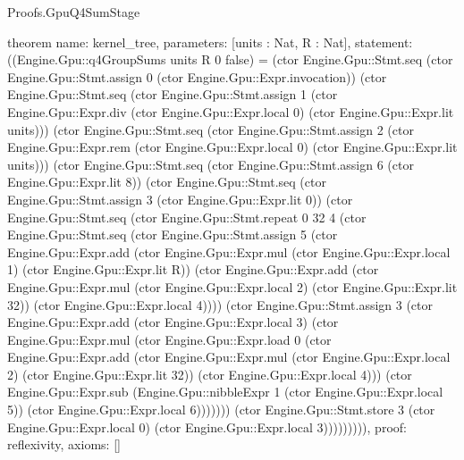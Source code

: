 \begin{lexlean}{Proofs.GpuQ4SumStage}
\begin{semanticmodule}
theorem{
  name: kernel_tree,
  parameters: [units : Nat, R : Nat],
  statement: ((Engine.Gpu::q4GroupSums units R 0 false) = (ctor Engine.Gpu::Stmt.seq (ctor Engine.Gpu::Stmt.assign 0 (ctor Engine.Gpu::Expr.invocation)) (ctor Engine.Gpu::Stmt.seq (ctor Engine.Gpu::Stmt.assign 1 (ctor Engine.Gpu::Expr.div (ctor Engine.Gpu::Expr.local 0) (ctor Engine.Gpu::Expr.lit units))) (ctor Engine.Gpu::Stmt.seq (ctor Engine.Gpu::Stmt.assign 2 (ctor Engine.Gpu::Expr.rem (ctor Engine.Gpu::Expr.local 0) (ctor Engine.Gpu::Expr.lit units))) (ctor Engine.Gpu::Stmt.seq (ctor Engine.Gpu::Stmt.assign 6 (ctor Engine.Gpu::Expr.lit 8)) (ctor Engine.Gpu::Stmt.seq (ctor Engine.Gpu::Stmt.assign 3 (ctor Engine.Gpu::Expr.lit 0)) (ctor Engine.Gpu::Stmt.seq (ctor Engine.Gpu::Stmt.repeat 0 32 4 (ctor Engine.Gpu::Stmt.seq (ctor Engine.Gpu::Stmt.assign 5 (ctor Engine.Gpu::Expr.add (ctor Engine.Gpu::Expr.mul (ctor Engine.Gpu::Expr.local 1) (ctor Engine.Gpu::Expr.lit R)) (ctor Engine.Gpu::Expr.add (ctor Engine.Gpu::Expr.mul (ctor Engine.Gpu::Expr.local 2) (ctor Engine.Gpu::Expr.lit 32)) (ctor Engine.Gpu::Expr.local 4)))) (ctor Engine.Gpu::Stmt.assign 3 (ctor Engine.Gpu::Expr.add (ctor Engine.Gpu::Expr.local 3) (ctor Engine.Gpu::Expr.mul (ctor Engine.Gpu::Expr.load 0 (ctor Engine.Gpu::Expr.add (ctor Engine.Gpu::Expr.mul (ctor Engine.Gpu::Expr.local 2) (ctor Engine.Gpu::Expr.lit 32)) (ctor Engine.Gpu::Expr.local 4))) (ctor Engine.Gpu::Expr.sub (Engine.Gpu::nibbleExpr 1 (ctor Engine.Gpu::Expr.local 5)) (ctor Engine.Gpu::Expr.local 6))))))) (ctor Engine.Gpu::Stmt.store 3 (ctor Engine.Gpu::Expr.local 0) (ctor Engine.Gpu::Expr.local 3))))))))),
  proof: reflexivity{},
  axioms: []
}


\end{semanticmodule}
\end{lexlean}
